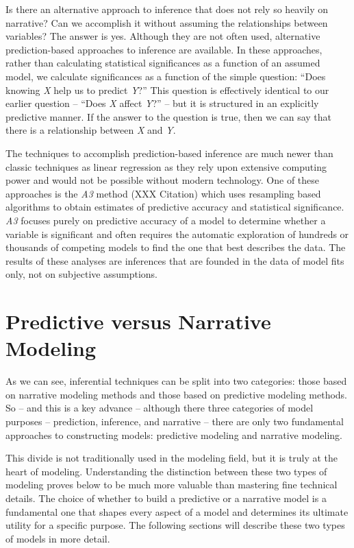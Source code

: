 \documentclass[]{memoir}
\begin{document}
Is there an alternative approach to inference that does not rely so
heavily on narrative? Can we accomplish it without assuming the
relationships between variables? The answer is yes. Although they are
not often used, alternative prediction-based approaches to inference are
available. In these approaches, rather than calculating statistical
significances as a function of an assumed model, we calculate
significances as a function of the simple question: ``Does knowing
\emph{X} help us to predict \emph{Y}?'' This question is effectively
identical to our earlier question -- ``Does \emph{X} affect \emph{Y}?''
-- but it is structured in an explicitly predictive manner. If the
answer to the question is true, then we can say that there is a
relationship between \emph{X} and \emph{Y}.

The techniques to accomplish prediction-based inference are much newer
than classic techniques as linear regression as they rely upon extensive
computing power and would not be possible without modern technology. One
of these approaches is the \emph{A3} method (XXX Citation) which uses
resampling based algorithms to obtain estimates of predictive accuracy
and statistical significance. \emph{A3} focuses purely on predictive
accuracy of a model to determine whether a variable is significant and
often requires the automatic exploration of hundreds or thousands of
competing models to find the one that best describes the data. The
results of these analyses are inferences that are founded in the data of
model fits only, not on subjective assumptions.

\section{Predictive versus Narrative Modeling}

As we can see, inferential techniques can be split into two categories:
those based on narrative modeling methods and those based on predictive
modeling methods. So -- and this is a key advance -- although there
three categories of model purposes -- prediction, inference, and
narrative -- there are only two fundamental approaches to constructing
models: predictive modeling and narrative modeling.

This divide is not traditionally used in the modeling field, but it is
truly at the heart of modeling. Understanding the distinction between
these two types of modeling proves below to be much more valuable than
mastering fine technical details. The choice of whether to build a
predictive or a narrative model is a fundamental one that shapes every
aspect of a model and determines its ultimate utility for a specific
purpose. The following sections will describe these two types of models
in more detail.
\end{document}
